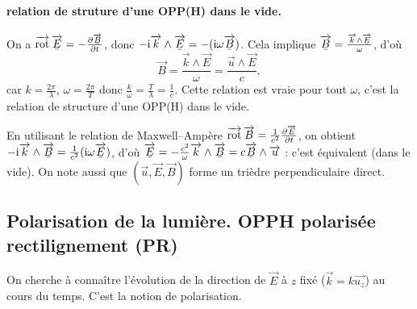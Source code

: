 \paragraph{relation de struture d'une OPP(H) dans le vide.}
On a $\vecrot\ubar{\vec{E}}=-\frac{\partial\ubar{\vec{B}}}{\partial t}$, donc $-\rmi\vec{k}\wedge\ubar{\vec{E}}=-(\rmi\omega\ubar{\vec{B}})$. Cela implique $\ubar{\vec{B}}=\frac{\vec{k}\wedge\ubar{\vec{E}}}{\omega}$, d'où
\begin{equation*}
    \boxed{
        \vec{B}=\frac{\vec{k}\wedge\vec{E}}{\omega}=\frac{\vec{u}\wedge\vec{E}}{c},
    }
\end{equation*}
car $k=\frac{2\pi}{\lambda}$, $\omega=\frac{2\pi}{T}$ donc $\frac{k}{\omega}=\frac{T}{\lambda}=\frac{1}{c}$. Cette relation est vraie pour tout $\omega$, c'est la relation de structure d'une OPP(H) dans le vide.

\begin{remark}
    En utilisant le relation de Maxwell--Ampère $\operatorname{\overrightarrow{\text{rot}}}\protect\overrightarrow{{B}}=\frac{1}{c^{2}}\frac{\partial\protect\overrightarrow{{E}}}{\partial t}$, on obtient $-\rmi\vec{k}\wedge\ubar{\vec{B}}=\frac{1}{c^{2}}(\rmi\omega\ubar{\vec{E}})$, d'où $\ubar{\vec{E}}=-\frac{c^{2}}{\omega}\vec{k}\wedge\ubar{\vec{B}}=c\ubar{\vec{B}}\wedge\vec{u}$ : c'est équivalent (dans le vide). On note aussi que $(\vec{u},\vec{E},\vec{B})$ forme un trièdre perpendiculaire direct.
\end{remark}

\subsection{Polarisation de la lumière. OPPH polarisée rectilignement (PR)}

On cherche à connaître l'évolution de la direction de $\vec{E}$ à $z$ fixé ($\vec{k}=k\vec{u_z}$) au cours du temps. C'est la notion de polarisation.

